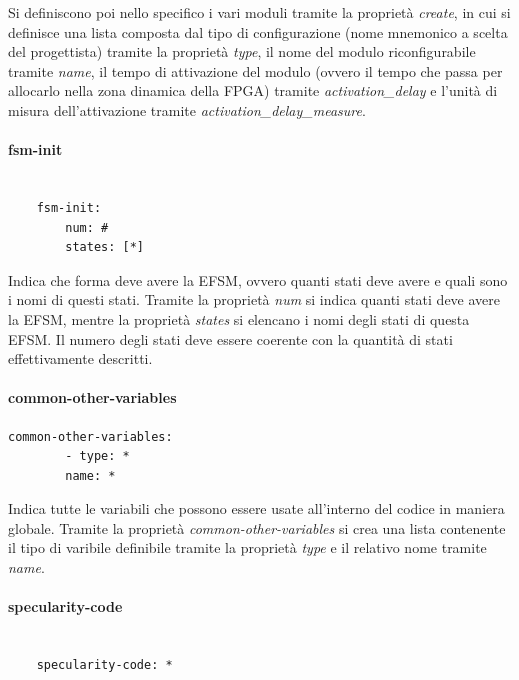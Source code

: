 \documentclass[a4paper,titlepage]{book}
\begin{document}
 Si definiscono poi nello specifico i vari moduli tramite la proprietà \textit{create}, in cui si definisce una lista composta dal tipo di configurazione (nome mnemonico a scelta del progettista) tramite la proprietà \textit{type}, il nome del modulo riconfigurabile tramite \textit{name}, il tempo di attivazione del modulo (ovvero il tempo che passa per allocarlo nella zona dinamica della FPGA) tramite \textit{activation\_delay} e l'unità di misura dell'attivazione tramite \textit{activation\_delay\_measure}.
  
\paragraph{fsm-init}

\begin{lstlisting}[frame=single]

	fsm-init:
		num: #
		states: [*]

\end{lstlisting} 

Indica che forma deve avere la EFSM, ovvero quanti stati deve avere e quali sono i nomi di questi stati. Tramite la proprietà \textit{num} si indica quanti stati deve avere la EFSM, mentre la proprietà \textit{states} si elencano i nomi degli stati di questa EFSM. Il numero degli stati deve essere coerente con la quantità di stati effettivamente descritti.

\paragraph{common-other-variables}

\begin{lstlisting}[frame=single]
	common-other-variables:
		- type: *
		name: *
\end{lstlisting}

Indica tutte le variabili che possono essere usate all'interno del codice in maniera globale. Tramite la proprietà \textit{common-other-variables} si crea una lista contenente il tipo di varibile definibile tramite la proprietà \textit{type} e il relativo nome tramite \textit{name}.

\paragraph{specularity-code}
\begin{lstlisting}[frame=single]
	
	specularity-code: *
	
\end{lstlisting}
\end{document}
